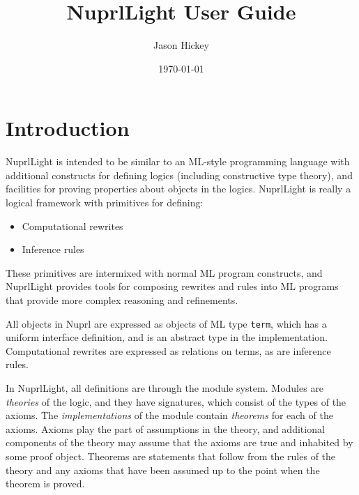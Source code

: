 \documentclass{article}
\newcommand\Nuprl{{\it Nuprl}}
\newcommand\NuprlLight{NuprlLight}
\begin{document}

\title{\NuprlLight{} User Guide}
\author{Jason Hickey}
\date{\today}

\maketitle

\section{Introduction}

\NuprlLight{} is intended to be similar to an ML-style programming language with additional
constructs for defining logics (including constructive type theory), and facilities for proving
properties about objects in the logics.  \NuprlLight{} is really a logical framework with primitives
for defining:
\begin{itemize}
\item
  Computational rewrites
\item
  Inference rules
\end{itemize}
These primitives are intermixed with normal ML program constructs, and \NuprlLight{} provides
tools for composing rewrites and rules into ML programs that provide more complex reasoning and
refinements.

All objects in Nuprl are expressed as objects of ML type {\tt term}, which has a uniform interface
definition, and is an abstract type in the implementation.  Computational rewrites are expressed as 
relations on terms, as are inference rules.


In \NuprlLight{}, all definitions are through the module system.  Modules are {\em theories\/} of
the logic, and they have signatures, which consist of the types of the axioms.  The {\em
  implementations\/} of the module contain {\em theorems\/} for each of the axioms.  Axioms play the
part of assumptions in the theory, and additional components of the theory may assume that the
axioms are true and inhabited by some proof object.  Theorems are statements that follow from the
rules of the theory and any axioms that have been assumed up to the point when the theorem is
proved.
\end{document}

